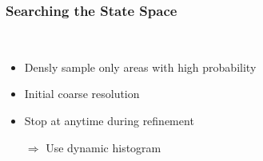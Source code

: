 \begin{frame}
  \frametitle{Searching the State Space}
  \begin{description}[]
  \item[In Real Time] \hfill \\
  \begin{itemize}
  \item Densly sample only areas with high probability
  \item Initial coarse resolution
  \item Stop at anytime during refinement
  \pause
  \item[$\Rightarrow$] Use dynamic histogram
  \end{itemize}
  \end{description}
\end{frame}

